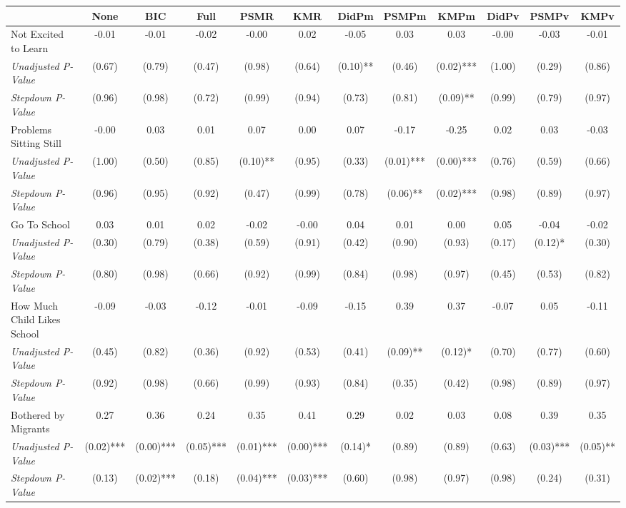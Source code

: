 \begin{tabular}{l c c c c c c c c c c c}
\toprule
 & None & BIC & Full & PSMR & KMR & DidPm & PSMPm & KMPm & DidPv & PSMPv & KMPv \\
\midrule
Not Excited to Learn & -0.01 & -0.01 & -0.02 & -0.00 & 0.02 & -0.05 & 0.03 & 0.03 & -0.00 & -0.03 & -0.01 \\
\quad \textit{Unadjusted P-Value} & (0.67) & (0.79) & (0.47) & (0.98) & (0.64) & (0.10)** & (0.46) & (0.02)*** & (1.00) & (0.29) & (0.86) \\
\quad \textit{Stepdown P-Value} & (0.96) & (0.98) & (0.72) & (0.99) & (0.94) & (0.73) & (0.81) & (0.09)** & (0.99) & (0.79) & (0.97) \\
Problems Sitting Still & -0.00 & 0.03 & 0.01 & 0.07 & 0.00 & 0.07 & -0.17 & -0.25 & 0.02 & 0.03 & -0.03 \\
\quad \textit{Unadjusted P-Value} & (1.00) & (0.50) & (0.85) & (0.10)** & (0.95) & (0.33) & (0.01)*** & (0.00)*** & (0.76) & (0.59) & (0.66) \\
\quad \textit{Stepdown P-Value} & (0.96) & (0.95) & (0.92) & (0.47) & (0.99) & (0.78) & (0.06)** & (0.02)*** & (0.98) & (0.89) & (0.97) \\
Go To School & 0.03 & 0.01 & 0.02 & -0.02 & -0.00 & 0.04 & 0.01 & 0.00 & 0.05 & -0.04 & -0.02 \\
\quad \textit{Unadjusted P-Value} & (0.30) & (0.79) & (0.38) & (0.59) & (0.91) & (0.42) & (0.90) & (0.93) & (0.17) & (0.12)* & (0.30) \\
\quad \textit{Stepdown P-Value} & (0.80) & (0.98) & (0.66) & (0.92) & (0.99) & (0.84) & (0.98) & (0.97) & (0.45) & (0.53) & (0.82) \\
How Much Child Likes School & -0.09 & -0.03 & -0.12 & -0.01 & -0.09 & -0.15 & 0.39 & 0.37 & -0.07 & 0.05 & -0.11 \\
\quad \textit{Unadjusted P-Value} & (0.45) & (0.82) & (0.36) & (0.92) & (0.53) & (0.41) & (0.09)** & (0.12)* & (0.70) & (0.77) & (0.60) \\
\quad \textit{Stepdown P-Value} & (0.92) & (0.98) & (0.66) & (0.99) & (0.93) & (0.84) & (0.35) & (0.42) & (0.98) & (0.89) & (0.97) \\
Bothered by Migrants & 0.27 & 0.36 & 0.24 & 0.35 & 0.41 & 0.29 & 0.02 & 0.03 & 0.08 & 0.39 & 0.35 \\
\quad \textit{Unadjusted P-Value} & (0.02)*** & (0.00)*** & (0.05)*** & (0.01)*** & (0.00)*** & (0.14)* & (0.89) & (0.89) & (0.63) & (0.03)*** & (0.05)** \\
\quad \textit{Stepdown P-Value} & (0.13) & (0.02)*** & (0.18) & (0.04)*** & (0.03)*** & (0.60) & (0.98) & (0.97) & (0.98) & (0.24) & (0.31) \\

\end{tabular}
